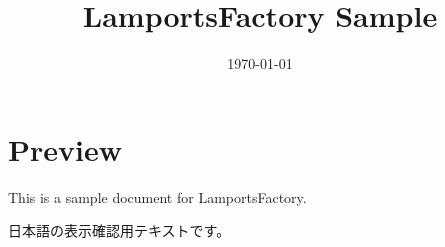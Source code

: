\documentclass{ltjsarticle}
\title{LamportsFactory Sample}
\author{}
\date{\today}
\begin{document}
\maketitle

\section{Preview}

This is a sample document for LamportsFactory.

日本語の表示確認用テキストです。
\end{document}
